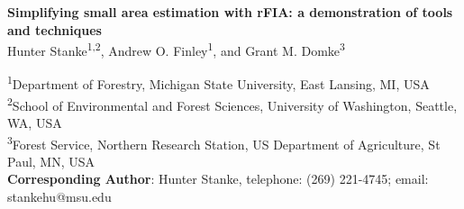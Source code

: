 \documentclass[11pt]{article}
\begin{document}
\begin{titlepage}
    \begin{center}
        \vspace*{1cm}
        \large
        \textbf{Simplifying small area estimation with rFIA: a demonstration of tools and techniques}\\
         \normalsize
           \vspace{5mm}
         Hunter Stanke\textsuperscript{1,2}, Andrew O. Finley\textsuperscript{1}, and Grant M. Domke\textsuperscript{3}\\
         \vspace{5mm}
    
    \end{center}
    \small
    \textsuperscript{1}Department of Forestry, Michigan State University, East Lansing, MI, USA\\
    \textsuperscript{2}School of Environmental and Forest Sciences, University of Washington, Seattle, WA, USA\\
    \textsuperscript{3}Forest Service, Northern Research Station, US Department of Agriculture, St Paul, MN, USA\\ 
    \noindent \textbf{Corresponding Author}: Hunter Stanke, telephone: (269) 221-4745; email: stankehu@msu.edu


\end{titlepage}
\end{document}
